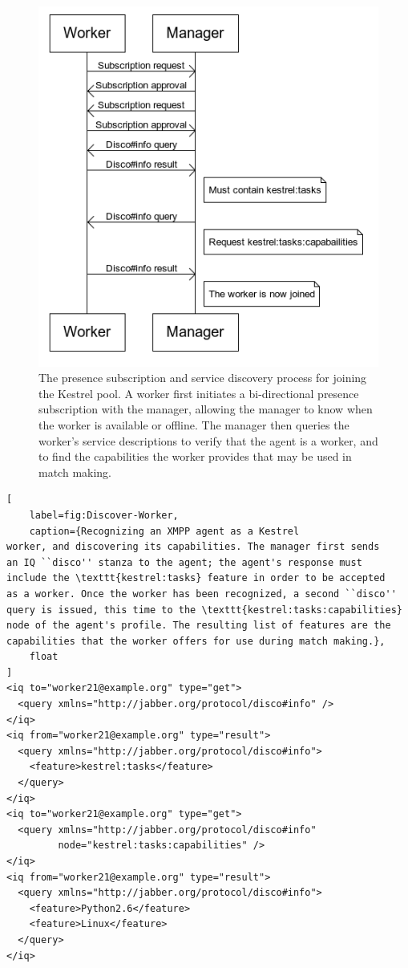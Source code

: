 \begin{figure}
\begin{center}
\includegraphics[width=12cm]{figures/join_pool}
\end{center}
\caption{\label{fig:Joining-the-Pool}The presence subscription and service
discovery process for joining the Kestrel pool. A worker first initiates
a bi-directional presence subscription with the manager, allowing
the manager to know when the worker is available or offline. The manager
then queries the worker's service descriptions to verify that the
agent is a worker, and to find the capabilities the worker provides
that may be used in match making.}
\end{figure}


\begin{lstlisting}[
    label=fig:Discover-Worker,
    caption={Recognizing an XMPP agent as a Kestrel
worker, and discovering its capabilities. The manager first sends
an IQ ``disco'' stanza to the agent; the agent's response must
include the \texttt{kestrel:tasks} feature in order to be accepted
as a worker. Once the worker has been recognized, a second ``disco''
query is issued, this time to the \texttt{kestrel:tasks:capabilities}
node of the agent's profile. The resulting list of features are the
capabilities that the worker offers for use during match making.},
    float
]
<iq to="worker21@example.org" type="get">
  <query xmlns="http://jabber.org/protocol/disco#info" />
</iq>
<iq from="worker21@example.org" type="result">
  <query xmlns="http://jabber.org/protocol/disco#info"> 
    <feature>kestrel:tasks</feature> 
  </query> 
</iq>
<iq to="worker21@example.org" type="get"> 
  <query xmlns="http://jabber.org/protocol/disco#info" 
         node="kestrel:tasks:capabilities" /> 
</iq>
<iq from="worker21@example.org" type="result">
  <query xmlns="http://jabber.org/protocol/disco#info">
    <feature>Python2.6</feature>
    <feature>Linux</feature>
  </query>
</iq>
\end{lstlisting}

